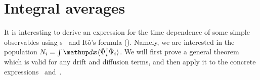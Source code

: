 \section{Integral averages}

It is interesting to derive an expression for the time dependence of some simple observables using s~ and It\^o's formula ().
Namely, we are interested in the population $N_i = \int \upd\xvec \langle \Psiop_i^\dagger \Psiop_i \rangle$.
We will first prove a general theorem which is valid for any drift and diffusion terms, and then apply it to the concrete expressions~ and~.

